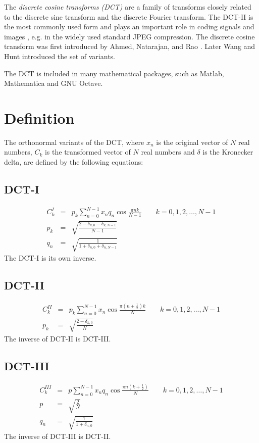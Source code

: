 \documentclass[12pt]{article}
\begin{document}
The \emph{discrete cosine transforms (DCT)} are a family of  transforms closely related to the discrete sine transform and the discrete Fourier transform. The DCT-II is the most commonly used form and plays an important role in coding signals and images \cite{Jain89}, e.g. in the widely used standard JPEG compression. The discrete cosine transform was first introduced by Ahmed, Natarajan, and Rao \cite{DCT}. Later Wang and Hunt \cite{DWT} introduced the  set of variants.

The DCT is included in many mathematical packages, such as Matlab, Mathematica and GNU Octave.

\section{Definition}

The orthonormal variants of the DCT, where $x_n$ is the original vector of $N$ real numbers, $C_k$ is the transformed vector of $N$ real numbers and $\delta$ is the Kronecker delta, are defined by the following equations:

\subsection{DCT-I}
\begin{eqnarray*}
C^I_k&=&p_k \sum _{n=0}^{N-1} x_n q_n \cos \frac{\pi n k}{N-1} \quad \quad k=0, 1, 2, \dots, N-1\\
p_k&=&\sqrt{\frac{2-\delta _{k,0}-\delta _{k,N-1}}{N-1}}\\
q_n&=&\sqrt{\frac{1}{1+\delta _{n,0}+\delta _{n,N-1}}}
\end{eqnarray*}
The DCT-I is its own inverse.

\subsection{DCT-II}
\begin{eqnarray*}
C^{II}_k&=&p_k \sum _{n=0}^{N-1} x_n \cos \frac{\pi \left(n+\frac{1}{2}\right) k}{N} \quad \quad k=0, 1, 2, \dots, N-1\\
p_k&=&\sqrt{\frac{2-\delta _{k,0}}{N}}
\end{eqnarray*}
The inverse of DCT-II is DCT-III.

\subsection{DCT-III}
\begin{eqnarray*}
C^{III}_k&=&p \sum _{n=0}^{N-1} x_n q_n \cos \frac{\pi n \left(k+\frac{1}{2}\right)}{N} \quad \quad k=0, 1, 2, \dots, N-1\\
p&=&\sqrt{\frac{2}{N}}\\
q_n&=&\sqrt{\frac{1}{1+\delta _{n,0}}}
\end{eqnarray*}
The inverse of DCT-III is DCT-II.
\end{document}
